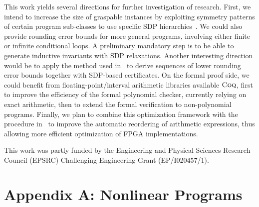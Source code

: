\documentclass[preprint]{sigplanconf}
\newcommand{\coq}{\text{\sc Coq}}
\theoremstyle{plain}
\begin{document}
This work yields several directions for further investigation of research. 
First, we intend to increase the size of graspable instances by exploiting symmetry patterns of certain program sub-classes to use specific SDP hierarchies~\cite{Riener2013SymmetricSDP}. We could also provide rounding error bounds for more general programs, involving either finite or infinite conditional loops. A preliminary mandatory step is to be able to generate inductive invariants with SDP relaxations. Another interesting direction would be to apply the method used in~\cite{Lasserre11} to derive sequences of lower rounding error bounds together with SDP-based certificates.
On the formal proof side, we could benefit from floating-point/interval arithmetic libraries available $\coq$, first to improve the efficiency of the formal polynomial checker, currently relying on exact arithmetic, then to extend the formal verification to non-polynomial programs.
%
Finally, we plan to combine this optimization framework with the procedure in~\cite{Gao15FPGA} to improve the automatic reordering of arithmetic expressions, thus allowing more efficient optimization of FPGA implementations.

\acks
This work was partly funded by the Engineering and Physical Sciences Research Council (EPSRC) Challenging Engineering Grant (EP/I020457/1).
\newpage



\fi

\appendix
\section*{Appendix A: Nonlinear Programs}
\label{sec:appa}
%

\end{document}
